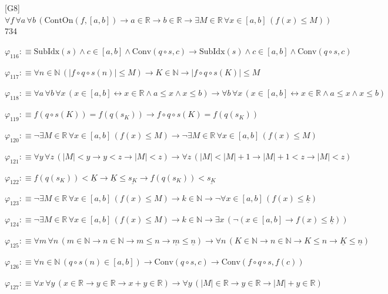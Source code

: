 \begin{fullproof}{[G8]}{$\forall f\,\forall a\,\forall b\,(\mathrm{ContOn}(f,[a,b]) \to a \in \mathbb{R} \to b \in \mathbb{R} \to \exists M \in \mathbb{R}\,\forall x \in [a,b]\,(f(x) \leq M))$}{734}
\begin{abbrevlist}
\item $\varphi_{116} :\equiv \mathrm{SubIdx}(s) \land c \in [a,b] \land \mathrm{Conv}(q \circ s,c) \to \mathrm{SubIdx}(s) \land c \in [a,b] \land \mathrm{Conv}(q \circ s,c)$
\item $\varphi_{117} :\equiv \forall n \in \mathbb{N}\,(\lvert f \circ q \circ s(n) \rvert \leq M) \to K \in \mathbb{N} \to \lvert f \circ q \circ s(K) \rvert \leq M$
\item $\varphi_{118} :\equiv \forall a\,\forall b\,\forall x\,(x \in [a,b] \leftrightarrow x \in \mathbb{R} \land a \leq x \land x \leq b) \to \forall b\,\forall x\,(x \in [a,b] \leftrightarrow x \in \mathbb{R} \land a \leq x \land x \leq b)$
\item $\varphi_{119} :\equiv f(q \circ s(K)) = f(q(s_{K})) \to f \circ q \circ s(K) = f(q(s_{K}))$
\item $\varphi_{120} :\equiv \neg \exists M \in \mathbb{R}\,\forall x \in [a,b]\,(f(x) \leq M) \to \neg \exists M \in \mathbb{R}\,\forall x \in [a,b]\,(f(x) \leq M)$
\item $\varphi_{121} :\equiv \forall y\,\forall z\,(\lvert M \rvert < y \to y < z \to \lvert M \rvert < z) \to \forall z\,(\lvert M \rvert < \lvert M \rvert + 1 \to \lvert M \rvert + 1 < z \to \lvert M \rvert < z)$
\item $\varphi_{122} :\equiv f(q(s_{K})) < \underline{K} \to \underline{K} \leq \underline{s_{K}} \to f(q(s_{K})) < \underline{s_{K}}$
\item $\varphi_{123} :\equiv \neg \exists M \in \mathbb{R}\,\forall x \in [a,b]\,(f(x) \leq M) \to k \in \mathbb{N} \to \neg \forall x \in [a,b]\,(f(x) \leq \underline{k})$
\item $\varphi_{124} :\equiv \neg \exists M \in \mathbb{R}\,\forall x \in [a,b]\,(f(x) \leq M) \to k \in \mathbb{N} \to \exists x\,(\neg (x \in [a,b] \to f(x) \leq \underline{k}))$
\item $\varphi_{125} :\equiv \forall m\,\forall n\,(m \in \mathbb{N} \to n \in \mathbb{N} \to m \leq n \to \underline{m} \leq \underline{n}) \to \forall n\,(K \in \mathbb{N} \to n \in \mathbb{N} \to K \leq n \to \underline{K} \leq \underline{n})$
\item $\varphi_{126} :\equiv \forall n \in \mathbb{N}\,(q \circ s(n) \in [a,b]) \to \mathrm{Conv}(q \circ s,c) \to \mathrm{Conv}(f \circ q \circ s,f(c))$
\item $\varphi_{127} :\equiv \forall x\,\forall y\,(x \in \mathbb{R} \to y \in \mathbb{R} \to x + y \in \mathbb{R}) \to \forall y\,(\lvert M \rvert \in \mathbb{R} \to y \in \mathbb{R} \to \lvert M \rvert + y \in \mathbb{R})$

\end{abbrevlist}
\end{fullproof}
